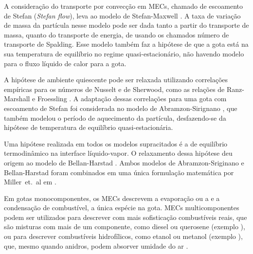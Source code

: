 A consideração do transporte por convecção em MECs, chamado de escoamento de Stefan (\emph{Stefan flow}), leva ao modelo de Stefan-Maxwell \cite{Law1978}.
A taxa de variação de massa da partícula nesse modelo pode ser dada tanto a partir do transporte de massa, quanto do transporte de energia, de usando os chamados número de transporte de Spalding.
Esse modelo também faz a hipótese de que a gota está na sua temperatura de equilíbrio no regime quasi-estacionário, não havendo modelo para o fluxo líquido de calor para a gota.

A hipótese de ambiente quiescente pode ser relaxada utilizando correlações empíricas para os números de Nusselt e de Sherwood, como as relações de Ranz-Marshall e Froessling \cite{Bird2002}. 
A adaptação dessas correlações para uma gota com escoamento de Stefan foi considerada no modelo de Abramzon-Sirignano \cite{Sirignano1989}, que também modelou o período de aquecimento da partícula, desfazendo-se da hipótese de temperatura de equilíbrio quasi-estacionária.

Uma hipótese realizada em todos os modelos supracitados é a de equilíbrio termodinâmico na interface líquido-vapor.
O relaxamento dessa hipótese deu origem ao modelo de Bellan-Harstad \cite{BellanJ1987}.
Ambos modelos de Abramzon-Sriginano e Bellan-Harstad foram combinados em uma única formulação matemática por Miller~et.~al em \cite{MillerR1998}.

Em gotas monocomponentes, os MECs descrevem a evaporação ou a e a condensação de combustível, a única espécie na gota.
MECs multicomponentes podem ser utilizados para descrever com mais sofisticação combustíveis reais, que são misturas com mais de um componente, como diesel ou querosene (exemplo \cite{FriedrichD2022,ShastryV2021,ShastryV2023,SekularacN2024}), ou para descrever combustíveis hidrofílicos, como etanol ou metanol (exemplo \cite{BojkoDesJardin2017CF,SacomanoF2024CF,SacomanoF2025CF,MaquaC2008,ZanuttoC2019,ChenL2016IJHMT}), que, mesmo quando anidros, podem absorver umidade do ar \cite{SacomanoF2024CF,SacomanoF2025CF}. 

